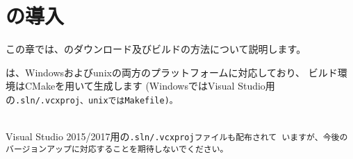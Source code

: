 \newpage
\section{\SprLib の導入}
\label{sec:InstallingSpringheadLibrary}

\noindent
この章では、\SprLib のダウンロード及びビルドの方法について説明します。

\medskip
\SprLib は、Windowsおよびunixの両方のプラットフォームに対応しており、
ビルド環境はCMakeを用いて生成します
(WindowsではVisual Studio用の\tt{.sln}/\tt{.vcxproj}、unixでは\tt{Makefile})。

\begin{narrow}[s]
	\thinrule{\linewidth}\\
	Visual Studio 2015/2017用の\tt{.sln}/\tt{.vcxproj}ファイルも配布されて
	いますが、今後のバージョンアップに対応することを期待しないでください。\\
	\Vskip{-\baselineskip}\thinrule{\linewidth}
\end{narrow}

